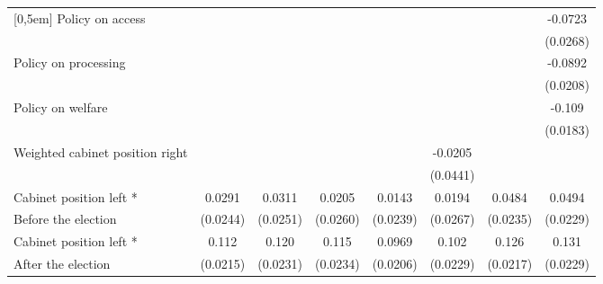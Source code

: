 \begin{table}[htbp]
\begin{tabular}{l*{7}{c}}
[0,5em]
Policy on access    &                     &                     &                     &                     &                     &                     &     -0.0723\sym{**} \\
                    &                     &                     &                     &                     &                     &                     &    (0.0268)         \\
[0,5em]
Policy on processing&                     &                     &                     &                     &                     &                     &     -0.0892\sym{***}\\
                    &                     &                     &                     &                     &                     &                     &    (0.0208)         \\
[0,5em]
Policy on welfare   &                     &                     &                     &                     &                     &                     &      -0.109\sym{***}\\
                    &                     &                     &                     &                     &                     &                     &    (0.0183)         \\
[0,5em]
Weighted cabinet position right&                     &                     &                     &                     &     -0.0205         &                     &                     \\
                    &                     &                     &                     &                     &    (0.0441)         &                     &                     \\
[0,5em]
Cabinet position left * &      0.0291         &      0.0311         &      0.0205         &      0.0143         &      0.0194         &      0.0484\sym{*}  &      0.0494\sym{*}  \\
Before the election                    &    (0.0244)         &    (0.0251)         &    (0.0260)         &    (0.0239)         &    (0.0267)         &    (0.0235)         &    (0.0229)         \\
[0,5em]
Cabinet position left * &       0.112\sym{***}&       0.120\sym{***}&       0.115\sym{***}&      0.0969\sym{***}&       0.102\sym{***}&       0.126\sym{***}&       0.131\sym{***}\\
After the election                    &    (0.0215)         &    (0.0231)         &    (0.0234)         &    (0.0206)         &    (0.0229)         &    (0.0217)         &    (0.0229)         \\

\end{tabular}
\end{table}
